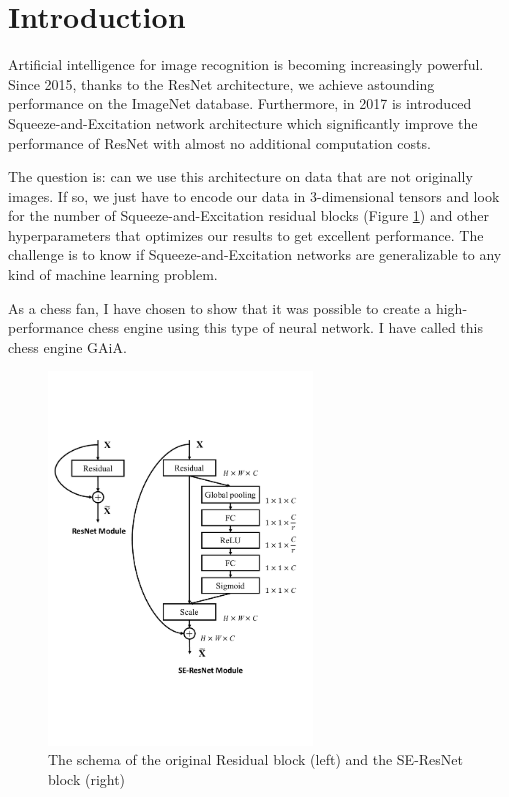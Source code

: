 \documentclass[unnumsec,webpdf,contemporary,large]{Article}%
\theoremstyle{thmstyleone}%
\theoremstyle{thmstyletwo}%
\theoremstyle{thmstylethree}%
\begin{document}
\section{Introduction}

Artificial intelligence for image recognition is becoming
increasingly powerful. Since 2015, thanks to the ResNet\cite{resnet}
architecture, we achieve astounding performance on the ImageNet database.
Furthermore, in 2017 is introduced Squeeze-and-Excitation\cite{squeezeandexcitation}
network architecture which significantly
improve the performance of ResNet with almost no additional computation costs.

The question is: can we use this architecture on data that are not
originally images. If so, we just have to encode our data in 3-dimensional
tensors and look for the number of Squeeze-and-Excitation residual
blocks (Figure \ref{fig:seblock}) and other hyperparameters
that optimizes our results to get excellent performance.
The challenge is to know if Squeeze-and-Excitation networks are
generalizable to any kind of machine learning problem.

As a chess fan, I have chosen to show that it was possible to create a
high-performance chess engine using this type of neural network.
I have called this chess engine GAiA.

\begin{figure}[H]
  \centering
  \includegraphics[width=7cm]{module_seresnet.pdf}
  \caption{The schema of the original Residual block (left) and the SE-ResNet
  block (right)}
  \label{fig:seblock}
\end{figure}
\end{document}

